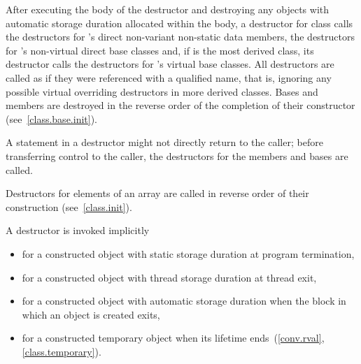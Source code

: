 \pnum
{}%
%
%
After executing the body of the destructor and destroying
any objects with automatic storage duration allocated within the body, a
destructor for class
calls the destructors for
's
direct non-variant non-static data members, the destructors for
's
non-virtual direct base classes and, if
is the most derived class,
its destructor calls the destructors for
's
virtual base classes.
All destructors are called as if they were referenced with a qualified name,
that is, ignoring any possible virtual overriding destructors in more
derived classes.
Bases and members are destroyed in the reverse order of the completion of
their constructor (see~\ref{class.base.init}).
\begin{note}
A
statement in a destructor might not directly return to the
caller; before transferring control to the caller, the destructors for the
members and bases are called.
\end{note}
%
Destructors for elements of an array are called in reverse order of their
construction (see~\ref{class.init}).

\pnum
{}%
%
A destructor is invoked implicitly
\begin{itemize}
\item for a constructed object with static storage duration at program termination,

\item for a constructed object with thread storage duration at thread exit,

\item for a constructed object with automatic storage duration when the block in which an object is created exits,

\item for a constructed temporary object when its lifetime ends~(\ref{conv.rval}, \ref{class.temporary}).
\end{itemize}

